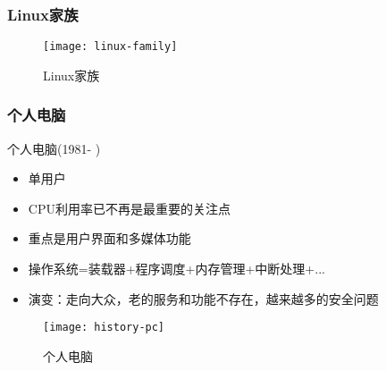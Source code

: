 %    
%    
%    
\begin{frame}
    \frametitle{Linux家族}
    
    \begin{figure}
        \centering
        \texttt{[image: linux-family]}
        \caption{Linux家族}
    \end{figure}
    
\end{frame}
\begin{frame}[plain]
	
	\frametitle{个人电脑}
	
	个人电脑(1981- )
	\begin{itemize}
		\item 单用户
		\item CPU利用率已不再是最重要的关注点	
		\item 重点是用户界面和多媒体功能
		\item 操作系统=装载器+程序调度+内存管理+中断处理+...
		\item 演变：走向大众，老的服务和功能不存在，越来越多的安全问题
	\end{itemize}
	
	\begin{figure}
		\centering
		\texttt{[image: history-pc]}
		\caption{个人电脑}
	\end{figure}
	
\end{frame}

